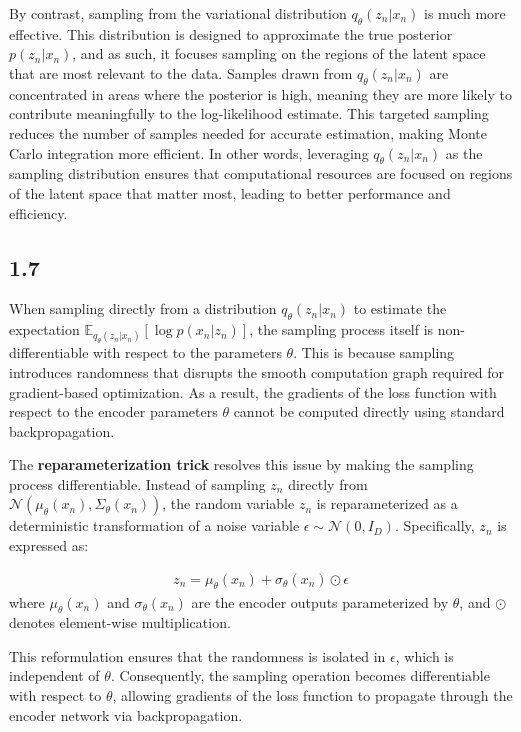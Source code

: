 \documentclass{article}
\begin{document}
By contrast, sampling from the variational distribution \( q_{\theta}(z_n|x_n) \) is much more effective. This distribution is designed to approximate the true posterior \( p(z_n | x_n) \), and as such, it focuses sampling on the regions of the latent space that are most relevant to the data. Samples drawn from \( q_{\theta}(z_n|x_n) \) are concentrated in areas where the posterior is high, meaning they are more likely to contribute meaningfully to the log-likelihood estimate. This targeted sampling reduces the number of samples needed for accurate estimation, making Monte Carlo integration more efficient. In other words, leveraging \( q_{\theta}(z_n|x_n) \) as the sampling distribution ensures that computational resources are focused on regions of the latent space that matter most, leading to better performance and efficiency.


\subsection*{1.7}

When sampling directly from a distribution \( q_{\theta}(z_n|x_n) \) to estimate the expectation \( \mathbb{E}_{q_{\theta}(z_n|x_n)}[\log p(x_n|z_n)] \), the sampling process itself is non-differentiable with respect to the parameters \( \theta \). This is because sampling introduces randomness that disrupts the smooth computation graph required for gradient-based optimization. As a result, the gradients of the loss function with respect to the encoder parameters \( \theta \) cannot be computed directly using standard backpropagation.

The \textbf{reparameterization trick} resolves this issue by making the sampling process differentiable. Instead of sampling \( z_n \) directly from \( \mathcal{N}(\mu_{\theta}(x_n), \Sigma_{\theta}(x_n)) \), the random variable \( z_n \) is reparameterized as a deterministic transformation of a noise variable \( \epsilon \sim \mathcal{N}(0, I_D) \). Specifically, \( z_n \) is expressed as:

\begin{align*}
    z_n = \mu_{\theta}(x_n) + \sigma_{\theta}(x_n) \odot \epsilon
\end{align*}
where \( \mu_{\theta}(x_n) \) and \( \sigma_{\theta}(x_n) \) are the encoder outputs parameterized by \( \theta \), and \( \odot \) denotes element-wise multiplication. 

This reformulation ensures that the randomness is isolated in \( \epsilon \), which is independent of \( \theta \). Consequently, the sampling operation becomes differentiable with respect to \( \theta \), allowing gradients of the loss function to propagate through the encoder network via backpropagation.
\end{document}
